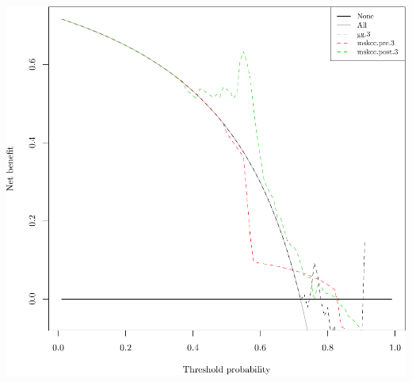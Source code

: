 \documentclass{article}\usepackage[]{graphicx}\usepackage[]{color}
\makeatletter
\def\maxwidth{ %
  \ifdim\Gin@nat@width>\linewidth
    \linewidth
  \else
    \Gin@nat@width
  \fi
}
\newenvironment{knitrout}{}{} %
\makeatother
\begin{document}
\begin{knitrout}
{\centering \includegraphics[width=\maxwidth]{figure/07-model-selection-dca-6} 

}



\end{knitrout}
\end{document}
